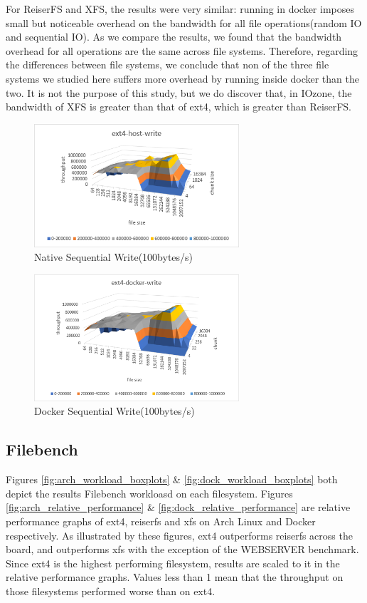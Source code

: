 \documentclass[letterpaper,twocolumn,10pt]{article}
\begin{document}
For ReiserFS and XFS, the results were very similar: running in docker imposes small but noticeable overhead on the bandwidth for all file 
operations(random IO and sequential IO). As we compare the results, we found that the bandwidth overhead for all operations are the same across 
file systems. Therefore, regarding the differences between file systems, we conclude that non of the three file systems we studied here suffers 
more overhead by running inside docker than the two. It is not the purpose of this study, but we do discover 
that, in IOzone, the bandwidth of XFS is greater 
than that of ext4, which is greater than ReiserFS. 



\begin{figure}[!ht]
\centering
\includegraphics[width=3in]{../results/ext4-host-write.png}
\caption{Native Sequential Write(100bytes/s)}
\label{fig:ext4-host-write}
\end{figure}

\begin{figure}[!ht]
\centering
\includegraphics[width=3in]{../results/ext4-docker-write.png}
\caption{Docker Sequential Write(100bytes/s)}
\label{fig:ext4-docker-write}
\end{figure}


\subsection{Filebench}
Figures \ref{fig:arch_workload_boxplots} \& \ref{fig:dock_workload_boxplots} both depict the results Filebench workloasd on each filesystem. Figures \ref{fig:arch_relative_performance} \& \ref{fig:dock_relative_performance} are relative performance graphs of ext4, reiserfs and xfs on Arch Linux and Docker respectively. As illustrated by these figures, ext4 outperforms reiserfs across the board, and outperforms xfs with the exception of the WEBSERVER benchmark. Since ext4 is the highest performing filesystem, results are scaled to it in the relative performance graphs. Values less than 1 mean that the throughput on those filesystems performed worse than on ext4. 
\\
\end{document}
